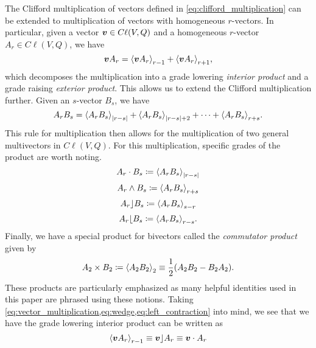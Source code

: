 The Clifford multiplication of vectors defined in \ref{eq:clifford_multiplication} can be extended to multiplication of vectors with homogeneous $r$-vectors.  In particular, given a vector $\blade{v} \in C\ell(V,Q)$ and a homogeneous $r$-vector $A_r \in C\ell(V,Q)$, we have
\begin{equation}
\label{eq:vector_multiplication}
\blade{v}A_r = \proj{r-1}{\blade{v}A_r} + \proj{r+1}{\blade{v}A_r},
\end{equation}
which decomposes the multiplication into a grade lowering \emph{interior product} and a grade raising \emph{exterior product}.  This allows us to extend the Clifford multiplication further. Given an $s$-vector $B_s$, we have
\begin{equation}
\label{eq:general_clifford_multiplication}
A_r B_s = \proj{|r-s|}{A_rB_s} + \proj{|r-s|+2}{A_rB_s} + \cdots + \proj{r+s}{A_rB_s}.
\end{equation}
This rule for multiplication then allows for the multiplication of two general multivectors in $C\ell(V,Q)$. For this multiplication, specific grades of the product are worth noting.
\begin{equation}
\label{eq:dot}
    A_r \cdot B_s \coloneqq \proj{|r-s|}{A_r B_s}
\end{equation}
\begin{equation}
\label{eq:wedge}
    A_r \wedge B_s \coloneqq \proj{r+s}{A_r B_s}
\end{equation}
\begin{equation}
\label{eq:left_contraction}
    A_r \rfloor B_s \coloneqq \proj{s-r}{A_r B_s}
\end{equation}
\begin{equation}
\label{eq:right_contraction}
    A_r \lfloor B_s \coloneqq \proj{r-s}{A_r B_s}.
\end{equation}
Finally, we have a special product for bivectors called the \emph{commutator product} given by
\begin{equation}
\label{eq:commutator_product}
    A_2 \times B_2 \coloneqq \proj{2}{A_2 B_2} \equiv \frac{1}{2} (A_2 B_2 - B_2 A_2).
\end{equation}
These products are particularly emphasized as many helpful identities used in this paper are phrased using these notions. Taking \cref{eq:vector_multiplication,eq:wedge,eq:left_contraction} into mind, we see that we have the grade lowering interior product can be written as
\begin{equation}
    \proj{r-1}{\blade{v}A_r} \equiv \blade{v}\rfloor A_r \equiv \blade{v} \cdot A_r
\end{equation}

